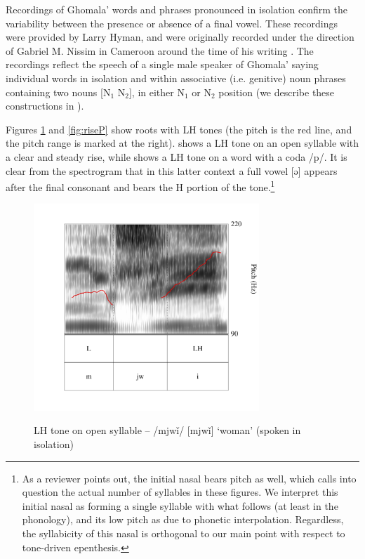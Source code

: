 \documentclass[output=paper,colorlinks,citecolor=brown,draft,draftmode]{langscibook}
\begin{document}
Recordings of Ghomala' words and phrases pronounced in isolation confirm the variability between the presence or absence of a final vowel.
These recordings were provided by Larry Hyman, and were originally recorded under the direction of Gabriel M. Nissim in Cameroon around the time of his writing \citep{nissim1981}.
The recordings reflect the speech of a single male speaker of Ghomala' saying individual words in isolation and within associative (i.e. genitive) noun phrases containing two nouns [N$_1$ N$_2$], in either N$_1$ or N$_2$ position (we  describe these constructions in ).

Figures \ref{fig:riseV} and \ref{fig:riseP} show roots with LH tones (the pitch is the red line, and the pitch range is marked at the right). 
 shows a LH tone on an open syllable with a clear and steady rise, while  shows a LH tone on a word with a coda /p/.
It is clear from the spectrogram that in this latter context a full vowel  [ə] appears after the final consonant and bears the H portion of the tone.\footnote{As a reviewer points out, the initial nasal bears pitch as well, which  calls into question the actual number of syllables in these figures. We interpret this initial nasal as forming a single syllable with what follows (at least in the phonology), and its  low pitch as due to phonetic interpolation. 
Regardless, the syllabicity of this nasal is orthogonal to our main point with respect to tone-driven epenthesis.}

\begin{figure}[p]
\caption{LH tone on open syllable -- /mjw\v{i}/ [mjw\v{i}] `woman' (spoken in isolation)}
\includegraphics[width=8.5cm]{figures/fig1_mjwi.pdf}
\label{fig:riseV}
\end{figure}
\end{document}
